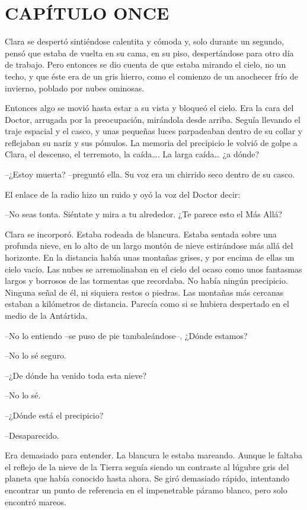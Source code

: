 \chapter*{CAPÍTULO ONCE}

{Clara se despertó sintiéndose calentita y cómoda y, solo durante un
 segundo, pensó que estaba de vuelta en su cama, en su piso,
 despertándose para otro día de trabajo. Pero entonces se dio cuenta de
 que estaba mirando el cielo, no un techo, y que éste era de un gris
 hierro, como el comienzo de un anochecer frío de invierno, poblado por
nubes ominosas.}

{Entonces algo se movió hasta estar a su vista y bloqueó el cielo. Era la
 cara del Doctor, arrugada por la preocupación, mirándola desde arriba.
 Seguía llevando el traje espacial y el casco, y unas pequeñas luces
 parpadeaban dentro de su collar y reflejaban su nariz y sus pómulos. La
 memoria del precipicio le volvió de golpe a Clara, el descenso, el
 terremoto, la caída\ldots{}. La larga caída\ldots{} ¿a dónde?}

{--¿Estoy muerta? --preguntó ella. Su voz era un chirrido seco dentro de
su casco.}

{El enlace de la radio hizo un ruido y oyó la voz del Doctor decir:}

{--No seas tonta. Siéntate y mira a tu alrededor. ¿Te parece esto el Más
Allá?}

{Clara se incorporó. Estaba rodeada de blancura. Estaba sentada sobre una
 profunda nieve, en lo alto de un largo montón de nieve estirándose más
 allá del horizonte. En la distancia había unas montañas grises, y por
 encima de ellas un cielo vacío. Las nubes se arremolinaban en el cielo
 del ocaso como unos fantasmas largos y borrosos de las tormentas que
 recordaba. No había ningún precipicio. Ninguna señal de él, ni siquiera
 restos o piedras. Las montañas más cercanas estaban a kilómetros de
 distancia. Parecía como si se hubiera despertado en el medio de la
Antártida.}

{--No lo entiendo --se puso de pie tambaleándose--. ¿Dónde estamos?}

{--No lo sé seguro.}

{--¿De dónde ha venido toda esta nieve?}

{--No lo sé.}

{--¿Dónde está el precipicio?}

{--Desaparecido.}

{Era demasiado para entender. La blancura le estaba mareando. Aunque le
 faltaba el reflejo de la nieve de la Tierra seguía siendo un contraste
 al lúgubre gris del planeta que había conocido hasta ahora. Se giró
 demasiado rápido, intentando encontrar un punto de referencia en el
impenetrable páramo blanco, pero solo encontró mareos.}

